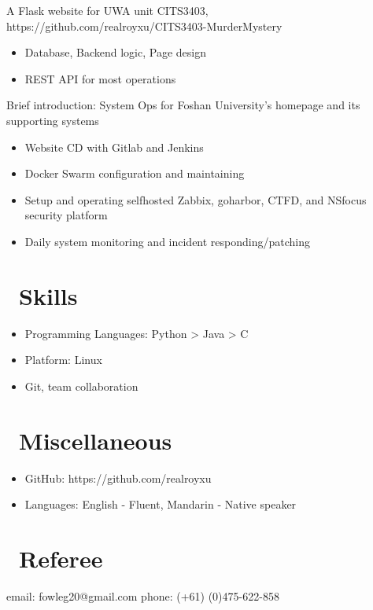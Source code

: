 \documentclass{resume}
\begin{document}
A Flask website for UWA unit CITS3403, https://github.com/realroyxu/CITS3403-MurderMystery
\begin{itemize}
  \item Database, Backend logic, Page design
  \item REST API for most operations
\end{itemize}

Brief introduction: System Ops for Foshan University's homepage and its supporting systems
\begin{itemize}
  \item Website CD with Gitlab and Jenkins
  \item Docker Swarm configuration and maintaining
  \item Setup and operating selfhosted Zabbix, goharbor, CTFD, and NSfocus security platform
  \item Daily system monitoring and incident responding/patching
\end{itemize}


\section{\faCogs\ Skills}
\begin{itemize}[parsep=0.5ex]
  \item Programming Languages: Python > Java > C
  \item Platform: Linux
  \item Git, team collaboration
\end{itemize}


\section{\faInfo\ Miscellaneous}
\begin{itemize}[parsep=0.5ex]
  \item GitHub: https://github.com/realroyxu
  \item Languages: English - Fluent, Mandarin - Native speaker
\end{itemize}



\section{\faFax\ Referee}
\begin{itemize}[parsep=0.5ex]
  email: fowleg20@gmail.com
  phone: (+61) (0)475-622-858
\end{itemize}
%
%
\end{document}
